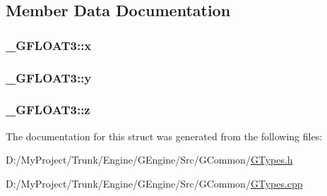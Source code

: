 \subsection{Member Data Documentation}
\hypertarget{struct___g_f_l_o_a_t3_a349b9fa6c098aafd537c7e74b1e1696e}{}
\subsubsection[{x}]{ \+\_\+\+G\+F\+L\+O\+A\+T3\+::x}\label{struct___g_f_l_o_a_t3_a349b9fa6c098aafd537c7e74b1e1696e}
\hypertarget{struct___g_f_l_o_a_t3_ac79b15fa423c67141dcb1ef2178bb308}{}
\subsubsection[{y}]{ \+\_\+\+G\+F\+L\+O\+A\+T3\+::y}\label{struct___g_f_l_o_a_t3_ac79b15fa423c67141dcb1ef2178bb308}
\hypertarget{struct___g_f_l_o_a_t3_a1e8890af618a74c458e2685b333bd577}{}
\subsubsection[{z}]{ \+\_\+\+G\+F\+L\+O\+A\+T3\+::z}\label{struct___g_f_l_o_a_t3_a1e8890af618a74c458e2685b333bd577}


The documentation for this struct was generated from the following files\+:\begin{DoxyCompactItemize}
\item 
D\+:/\+My\+Project/\+Trunk/\+Engine/\+G\+Engine/\+Src/\+G\+Common/\hyperlink{_g_types_8h}{G\+Types.\+h}\item 
D\+:/\+My\+Project/\+Trunk/\+Engine/\+G\+Engine/\+Src/\+G\+Common/\hyperlink{_g_types_8cpp}{G\+Types.\+cpp}\end{DoxyCompactItemize}
